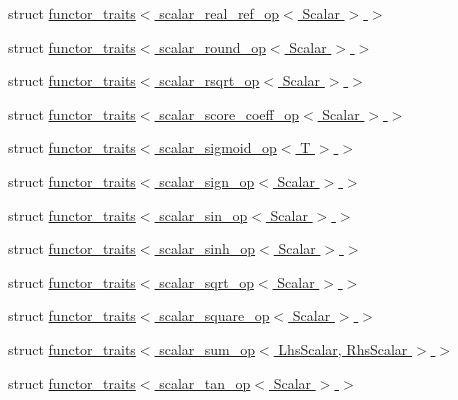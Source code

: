\begin{DoxyCompactItemize}
struct \hyperlink{struct_eigen_1_1internal_1_1functor__traits_3_01scalar__real__ref__op_3_01_scalar_01_4_01_4}{functor\+\_\+traits$<$ scalar\+\_\+real\+\_\+ref\+\_\+op$<$ Scalar $>$ $>$}
\item 
struct \hyperlink{struct_eigen_1_1internal_1_1functor__traits_3_01scalar__round__op_3_01_scalar_01_4_01_4}{functor\+\_\+traits$<$ scalar\+\_\+round\+\_\+op$<$ Scalar $>$ $>$}
\item 
struct \hyperlink{struct_eigen_1_1internal_1_1functor__traits_3_01scalar__rsqrt__op_3_01_scalar_01_4_01_4}{functor\+\_\+traits$<$ scalar\+\_\+rsqrt\+\_\+op$<$ Scalar $>$ $>$}
\item 
struct \hyperlink{struct_eigen_1_1internal_1_1functor__traits_3_01scalar__score__coeff__op_3_01_scalar_01_4_01_4}{functor\+\_\+traits$<$ scalar\+\_\+score\+\_\+coeff\+\_\+op$<$ Scalar $>$ $>$}
\item 
struct \hyperlink{struct_eigen_1_1internal_1_1functor__traits_3_01scalar__sigmoid__op_3_01_t_01_4_01_4}{functor\+\_\+traits$<$ scalar\+\_\+sigmoid\+\_\+op$<$ T $>$ $>$}
\item 
struct \hyperlink{struct_eigen_1_1internal_1_1functor__traits_3_01scalar__sign__op_3_01_scalar_01_4_01_4}{functor\+\_\+traits$<$ scalar\+\_\+sign\+\_\+op$<$ Scalar $>$ $>$}
\item 
struct \hyperlink{struct_eigen_1_1internal_1_1functor__traits_3_01scalar__sin__op_3_01_scalar_01_4_01_4}{functor\+\_\+traits$<$ scalar\+\_\+sin\+\_\+op$<$ Scalar $>$ $>$}
\item 
struct \hyperlink{struct_eigen_1_1internal_1_1functor__traits_3_01scalar__sinh__op_3_01_scalar_01_4_01_4}{functor\+\_\+traits$<$ scalar\+\_\+sinh\+\_\+op$<$ Scalar $>$ $>$}
\item 
struct \hyperlink{struct_eigen_1_1internal_1_1functor__traits_3_01scalar__sqrt__op_3_01_scalar_01_4_01_4}{functor\+\_\+traits$<$ scalar\+\_\+sqrt\+\_\+op$<$ Scalar $>$ $>$}
\item 
struct \hyperlink{struct_eigen_1_1internal_1_1functor__traits_3_01scalar__square__op_3_01_scalar_01_4_01_4}{functor\+\_\+traits$<$ scalar\+\_\+square\+\_\+op$<$ Scalar $>$ $>$}
\item 
struct \hyperlink{struct_eigen_1_1internal_1_1functor__traits_3_01scalar__sum__op_3_01_lhs_scalar_00_01_rhs_scalar_01_4_01_4}{functor\+\_\+traits$<$ scalar\+\_\+sum\+\_\+op$<$ Lhs\+Scalar, Rhs\+Scalar $>$ $>$}
\item 
struct \hyperlink{struct_eigen_1_1internal_1_1functor__traits_3_01scalar__tan__op_3_01_scalar_01_4_01_4}{functor\+\_\+traits$<$ scalar\+\_\+tan\+\_\+op$<$ Scalar $>$ $>$}

\end{DoxyCompactItemize}
